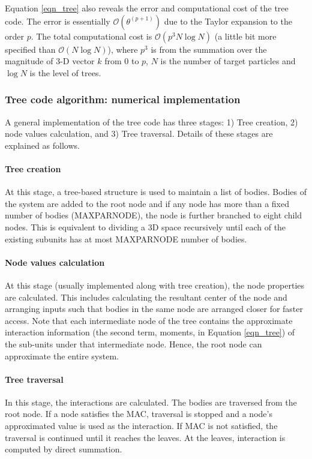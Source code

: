 \documentclass[draftclsnofoot]{elsarticle}
\begin{document}
Equation \ref{eqn_tree} also reveals the error and computational cost of the tree code. The error is essentially $\mathcal{O}(\theta^{(p+1)})$ due to the Taylor expansion to the order $p$. The total computational cost is $\mathcal{O}(p^3N \log N)$ (a little bit more specified than $\mathcal{O}(N\log N)$), where $p^3$ is from the summation over the magnitude of 3-D vector $k$ from 0 to $p$, $N$ is the number of target particles and $\log N$ is the level of trees. 
 

\subsubsection{Tree code algorithm: numerical implementation}
A general implementation of the tree code has three stages: 1) Tree creation, 2) node values calculation, and 3) Tree traversal. Details of these stages are explained as follows.
\paragraph{ Tree creation} At this stage, a tree-based structure is used to maintain a list of bodies.  Bodies of the system are added to the root node  and if any node
has more than a fixed number of  bodies (MAXPARNODE), the node is further branched to eight child nodes. This is equivalent to dividing a 3D space recursively until each of the existing subunits has at most MAXPARNODE number of bodies. 

\paragraph{Node values calculation}
At this stage (usually implemented along with tree creation), the node  properties are calculated. This includes calculating the resultant center of the node and arranging 
inputs such that bodies in the same node are arranged closer for faster access. Note that each intermediate node of the tree contains the approximate interaction 
information (the second term, moments, in Equation \ref{eqn_tree}) of the sub-units under that intermediate node.  Hence, the root node can approximate the entire system. 
 
\paragraph{Tree traversal}
In this stage, the interactions are calculated. The bodies are traversed from the root node. If a node satisfies the MAC, traversal is stopped and a node's approximated value
is used as the interaction. If MAC is not satisfied, the traversal is continued until it reaches the leaves. At the leaves, interaction is computed by direct summation.
\end{document}
